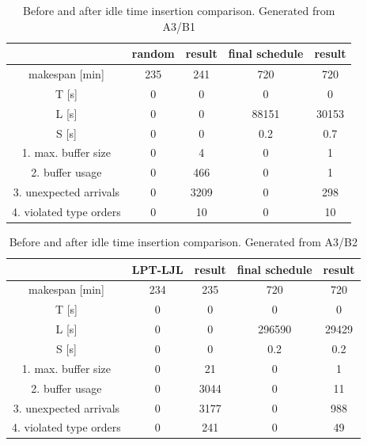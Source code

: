 \documentclass{ctuthesis}
\begin{document}
\begin{table}[H]
\begin{tabular}{ |c|| c | c | c | c |} 
\hline
 & random & result & final schedule & result \\ 
\hline
makespan [min] & 235 & 241 & 720 & 720 \\
\hline
T [s]& 0 & 0 & 0 & 0 \\
\hline
L [s]& 0 & 0 & 88151 & 30153 \\
\hline
S [s]& 0 & 0 & 0.2 & 0.7 \\
\hline
1. max. buffer size & 0 & 4 & 0 & 1\\ 
\hline
2. buffer usage  & 0 & 466 & 0 & 1\\ 
\hline
3. unexpected arrivals & 0 & 3209 & 0 & 298\\ 
\hline
4. violated type orders & 0 & 10 & 0 & 10\\ 
\hline
\end{tabular}
\caption{Before and after idle time insertion comparison. Generated from A3/B1}
\end{table}


\begin{table}[H]
\begin{tabular}{ |c|| c | c | c | c |} 
\hline
 & LPT-LJL & result & final schedule & result \\ 
\hline
makespan [min] & 234 & 235 & 720 & 720 \\
\hline
T [s]& 0 & 0 & 0 & 0 \\
\hline
L [s]& 0 & 0 & 296590 & 29429 \\
\hline
S [s]& 0 & 0 & 0.2 & 0.2 \\
\hline
1. max. buffer size & 0 & 21 & 0 & 1\\ 
\hline
2. buffer usage  & 0 & 3044 & 0 & 11\\ 
\hline
3. unexpected arrivals & 0 & 3177 & 0 & 988\\ 
\hline
4. violated type orders & 0 & 241 & 0 & 49\\ 
\hline
\end{tabular}
\caption{Before and after idle time insertion comparison. Generated from A3/B2}
\end{table}
\end{document}
